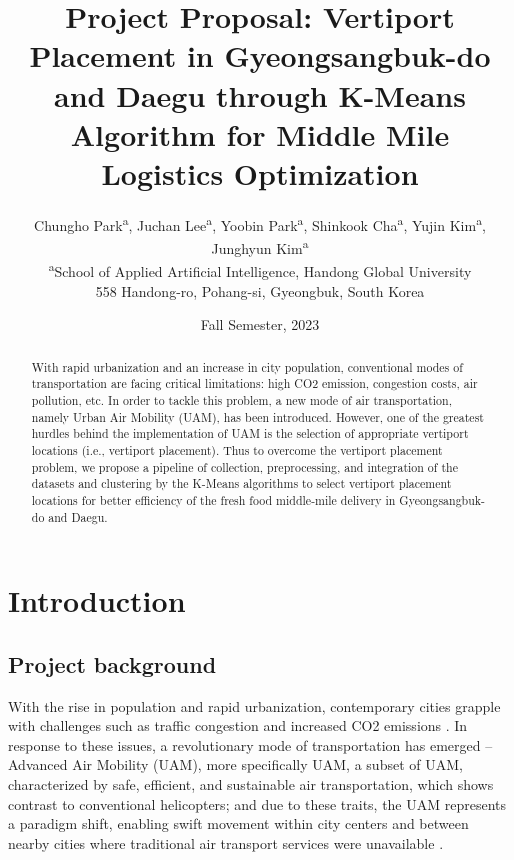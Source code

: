 \documentclass[11pt]{article}
\begin{document}
           

    \title{Project Proposal: Vertiport Placement in Gyeongsangbuk-do and Daegu through K-Means Algorithm for Middle Mile Logistics Optimization}          
    \author{
        Chungho Park\textsuperscript{a},
        Juchan Lee\textsuperscript{a},
        Yoobin Park\textsuperscript{a},
        Shinkook Cha\textsuperscript{a},
        Yujin Kim\textsuperscript{a},
        Junghyun Kim\textsuperscript{a}\\
        {\small \textsuperscript{a}School of Applied Artificial Intelligence, Handong Global University}\\
        {\small 558 Handong-ro, Pohang-si, Gyeongbuk, South Korea}\\
    }

    \date{Fall Semester, 2023}      

 
    \maketitle                 
 
    \begin{abstract}
        With rapid urbanization and an increase in city population, conventional modes of transportation are facing critical limitations: high CO2 emission, congestion costs, air pollution, etc. In order to tackle this problem, a new mode of air transportation, namely Urban Air Mobility (UAM), has been introduced. However, one of the greatest hurdles behind the implementation of UAM is the selection of appropriate vertiport locations (i.e., vertiport placement). Thus to overcome the vertiport placement problem, we propose a pipeline of collection, preprocessing, and integration of the datasets and clustering by the K-Means algorithms to select vertiport placement locations for better efficiency of the fresh food middle-mile delivery in Gyeongsangbuk-do and Daegu. 
    \end{abstract}

    \tableofcontents
    \newpage
    
    \section{Introduction} 
    \subsection{Project background}
    With the rise in population and rapid urbanization, contemporary cities grapple with challenges such as traffic congestion and increased CO2 emissions \citep{LeeHong2021}. In response to these issues, a revolutionary mode of transportation has emerged – Advanced Air Mobility (UAM), more specifically UAM, a subset of UAM, characterized by safe, efficient, and sustainable air transportation, which shows contrast to conventional helicopters\citep{LeeHong2021, YunLeeHwang2019}; and due to these traits, the UAM represents a paradigm shift, enabling swift movement within city centers and between nearby cities where traditional air transport services were unavailable \citep{JungYuYun2021}.
    
\end{document}
